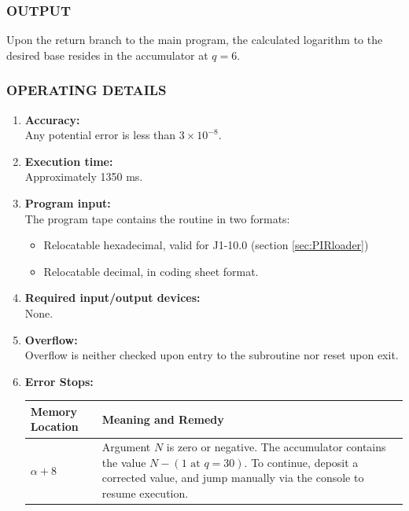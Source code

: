 \subsubsection*{OUTPUT}
Upon the return branch to the main program, the calculated logarithm to the desired base resides in the accumulator at $q=6$.

\subsubsection*{OPERATING DETAILS}

\begin{enumerate}[leftmargin=1.5em, itemsep=6pt]
    \item \textbf{Accuracy:} \\
    Any potential error is less than $3 \times 10^{-8}$.

    \item \textbf{Execution time:} \\
    Approximately 1350 ms.

    \item \textbf{Program input:} \\
    The program tape contains the routine in two formats:
    \begin{itemize}
      \item Relocatable hexadecimal, valid for J1-10.0 (section \ref{sec:PIRloader})
        \item Relocatable decimal, in coding sheet format.
    \end{itemize}

    \item \textbf{Required input/output devices:} \\
    None.

    \item \textbf{Overflow:} \\
    Overflow is neither checked upon entry to the subroutine nor reset upon exit.

    \item \textbf{Error Stops:} \\
  \begin{tabularx}{\textwidth}{lX}
    \toprule
    \textbf{Memory Location} & \textbf{Meaning and Remedy} \\
    \midrule
    $\alpha+8$  & Argument $N$ is zero or negative. The accumulator contains the value $N - (1 \text{ at } q=30)$. To continue, deposit a corrected value, and jump manually via the console to resume execution. \\
    \bottomrule
  \end{tabularx}
\end{enumerate}

